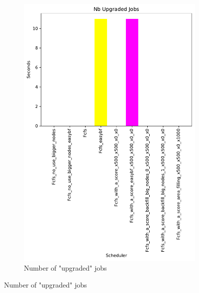 \documentclass[a4paper]{article}
\begin{document}
\begin{figure}[H]\centering
\begin{subfigure}[b]{0.4\linewidth}\centering\includegraphics[width=1\linewidth]{MBSS/plot/Results_Size_And_Data_2022-01-24->2022-01-24_Nb_Upgraded_Jobs_450_128_32_256_4_1024.pdf}\caption{Number of "upgraded" jobs}\label{17}\end{subfigure}

\end{figure}
\end{document}
